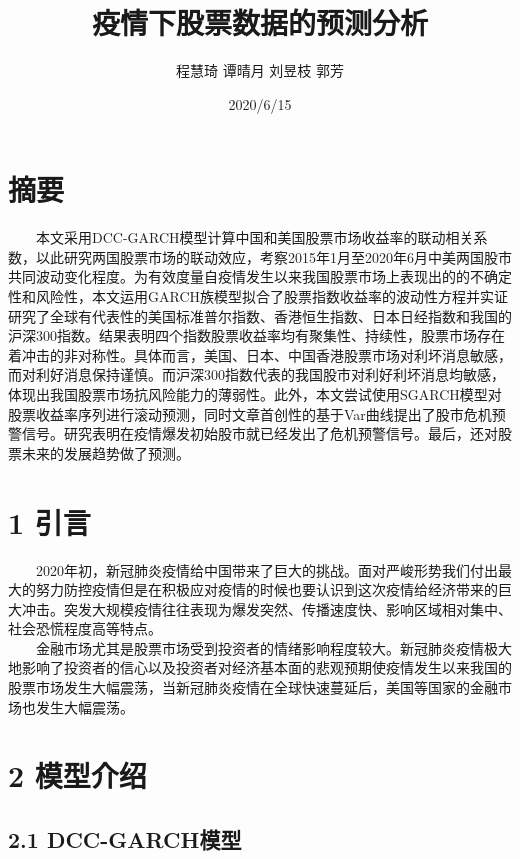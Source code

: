 \documentclass[
  11pt,
  letterpaper,
]{article}
\title{疫情下股票数据的预测分析}
\author{程慧琦 谭晴月 刘昱枝 郭芳}
\date{2020/6/15}
\begin{document}
\maketitle

\hypertarget{ux6458ux8981}{%
\section{摘要}\label{ux6458ux8981}}

  本文采用DCC-GARCH模型计算中国和美国股票市场收益率的联动相关系数，以此研究两国股票市场的联动效应，考察2015年1月至2020年6月中美两国股市共同波动变化程度。为有效度量自疫情发生以来我国股票市场上表现出的的不确定性和风险性，本文运用GARCH族模型拟合了股票指数收益率的波动性方程并实证研究了全球有代表性的美国标准普尔指数、香港恒生指数、日本日经指数和我国的沪深300指数。结果表明四个指数股票收益率均有聚集性、持续性，股票市场存在着冲击的非对称性。具体而言，美国、日本、中国香港股票市场对利坏消息敏感，而对利好消息保持谨慎。而沪深300指数代表的我国股市对利好利坏消息均敏感，体现出我国股票市场抗风险能力的薄弱性。此外，本文尝试使用SGARCH模型对股票收益率序列进行滚动预测，同时文章首创性的基于Var曲线提出了股市危机预警信号。研究表明在疫情爆发初始股市就已经发出了危机预警信号。最后，还对股票未来的发展趋势做了预测。

\hypertarget{ux5f15ux8a00}{%
\section{1 引言}\label{ux5f15ux8a00}}

  2020年初，新冠肺炎疫情给中国带来了巨大的挑战。面对严峻形势我们付出最大的努力防控疫情但是在积极应对疫情的时候也要认识到这次疫情给经济带来的巨大冲击。突发大规模疫情往往表现为爆发突然、传播速度快、影响区域相对集中、社会恐慌程度高等特点。\\
  金融市场尤其是股票市场受到投资者的情绪影响程度较大。新冠肺炎疫情极大地影响了投资者的信心以及投资者对经济基本面的悲观预期使疫情发生以来我国的股票市场发生大幅震荡，当新冠肺炎疫情在全球快速蔓延后，美国等国家的金融市场也发生大幅震荡。

\hypertarget{ux6a21ux578bux4ecbux7ecd}{%
\section{2 模型介绍}\label{ux6a21ux578bux4ecbux7ecd}}

\hypertarget{dcc-garchux6a21ux578b}{%
\subsection{2.1 DCC-GARCH模型}\label{dcc-garchux6a21ux578b}}
\end{document}
